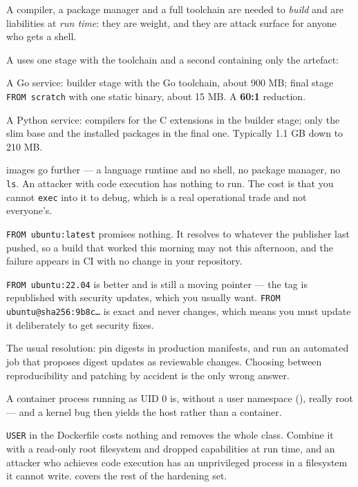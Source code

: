 \begin{conceptbox}
A compiler, a package manager and a full toolchain are needed to \emph{build}
and are liabilities at \emph{run time}: they are weight, and they are attack
surface for anyone who gets a shell.

\smallskip
A  uses one stage with the toolchain and a second
containing only the artefact:

\smallskip
\begin{tight}
  \item A Go service: builder stage with the Go toolchain, about 900 MB; final
        stage \texttt{FROM scratch} with one static binary, about 15 MB. A
        \textbf{60:1} reduction.
  \item A Python service: compilers for the C extensions in the builder stage;
        only the slim base and the installed packages in the final one.
        Typically 1.1 GB down to 210 MB.
\end{tight}

\smallskip
{} images go further --- a language runtime and no shell, no
package manager, no \texttt{ls}. An attacker with code execution has nothing to
run. The cost is that you cannot \texttt{exec} into it to debug, which is a
real operational trade and not everyone's.
\end{conceptbox}

\begin{alertbox}
\texttt{FROM ubuntu:latest} promises nothing. It resolves to whatever the
publisher last pushed, so a build that worked this morning may not this
afternoon, and the failure appears in CI with no change in your repository.

\smallskip
\texttt{FROM ubuntu:22.04} is better and is still a moving pointer --- the tag
is republished with security updates, which you usually want.
\texttt{FROM ubuntu@sha256:9b8c\ldots} is exact and never changes, which means
you must update it deliberately to get security fixes.

\smallskip
The usual resolution: pin digests in production manifests, and run an automated
job that proposes digest updates as reviewable changes. Choosing between
reproducibility and patching by accident is the only wrong answer.
\end{alertbox}

\begin{conceptbox}
A container process running as UID 0 is, without a user namespace
(), really root --- and a kernel bug then yields the host
rather than a container.

\smallskip
\texttt{USER} in the Dockerfile costs nothing and removes the whole class.
Combine it with a read-only root filesystem and dropped capabilities at run
time, and an attacker who achieves code execution has an unprivileged process
in a filesystem it cannot write.  covers the rest of the
hardening set.
\end{conceptbox}


